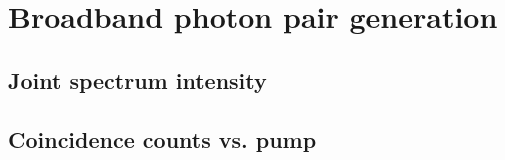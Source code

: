 \chapter{Broadband photon pair generation}
\section{Joint spectrum intensity}
\section{Coincidence counts vs. pump}

